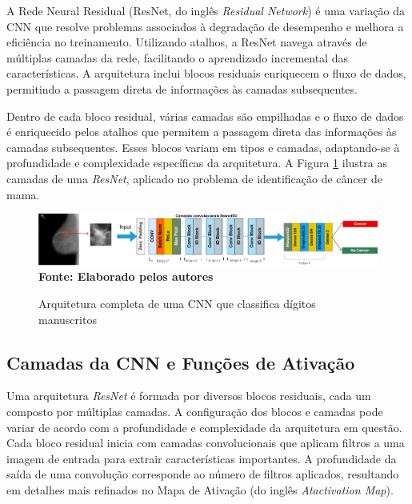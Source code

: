 A Rede Neural Residual (ResNet, do inglês \textit{Residual Network}) é uma variação da CNN que resolve problemas associados à degradação de desempenho e melhora a eficiência no treinamento. Utilizando atalhos, a ResNet navega através de múltiplas camadas da rede, facilitando o aprendizado incremental das características. A arquitetura inclui blocos residuais enriquecem o fluxo de dados, permitindo a passagem direta de informações às camadas subsequentes.

Dentro de cada bloco residual, várias camadas são empilhadas e o fluxo de dados é enriquecido pelos atalhos que permitem a passagem direta das informações às camadas subsequentes. Esses blocos variam em tipos e camadas, adaptando-se à profundidade e complexidade específicas da arquitetura. A Figura \ref{fig:cnn} ilustra as camadas de uma \textit{ResNet}, aplicado no problema de identificação de câncer de mama.

\begin{figure}[ht]
 	\centering	
 	\caption[\hspace{0.1cm}Grade Computacional.]{Arquitetura completa de uma CNN que classifica dígitos manuscritos}
 	\vspace{-0.2cm}
 	\includegraphics[width=1\textwidth]{figuras/cnn.png}
 	\captionsetup{justification=centering}
	\vspace{-0.2cm}
     \\\textbf{\footnotesize Fonte: Elaborado pelos autores}
	\label{fig:cnn}
\end{figure}

\subsection{\esp Camadas da CNN e Funções de Ativação} \label{camadasfund}

Uma arquitetura \textit{ResNet} é formada por diversos blocos residuais, cada um composto por múltiplas camadas. A configuração dos blocos e camadas pode variar de acordo com a profundidade e complexidade da arquitetura em questão. Cada bloco residual inicia com camadas convolucionais que aplicam filtros a uma imagem de entrada para extrair características importantes. A profundidade da saída de uma convolução corresponde ao número de filtros aplicados, resultando em detalhes mais refinados no Mapa de Ativação (do inglês \textit{Atactivation Map}).

